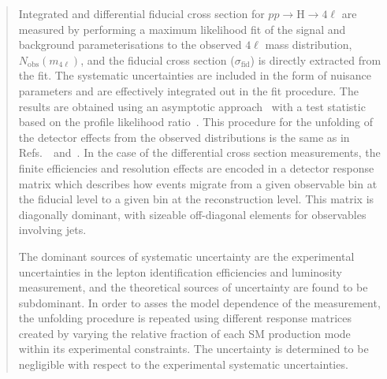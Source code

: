 \begin{abstract}
\par Integrated and differential fiducial cross section for $pp\to$H$\to4\ell$ are measured by performing a maximum likelihood fit of the signal and background parameterisations to the observed $4\ell$ mass distribution, $N_{\mathrm{obs}}(m_{4\ell})$, and the fiducial cross section ($\sigma_{\mathrm{fid}}$) is directly extracted from the fit. The systematic uncertainties are included in the form of nuisance parameters and are effectively integrated out in the fit procedure. The results are obtained using an asymptotic approach~\cite{LHC-HCG} with a test statistic based on the profile likelihood ratio~\cite{Cowan:2010js}. This procedure for the unfolding of the detector effects from the observed distributions is the same as in Refs.~\cite{CMSH4lFiducial8TeV}~and~\cite{CMSHggFiducial8TeV}. In the case of the differential cross section measurements,  the finite efficiencies and resolution effects are encoded in a detector response matrix which describes how events migrate from a given observable bin at the fiducial level to a given bin at the reconstruction level. This matrix is diagonally dominant, with sizeable off-diagonal elements for observables involving jets.
\par The dominant sources of systematic uncertainty are the experimental uncertainties in the lepton identification efficiencies and
luminosity measurement, and the theoretical sources of uncertainty are found to be subdominant.
In order to asses the model dependence of the measurement, the unfolding procedure is repeated
using different response matrices created by varying the relative fraction of each SM production mode
within its experimental constraints. The uncertainty is determined
to be negligible with respect to the experimental systematic uncertainties.	

\end{abstract}
